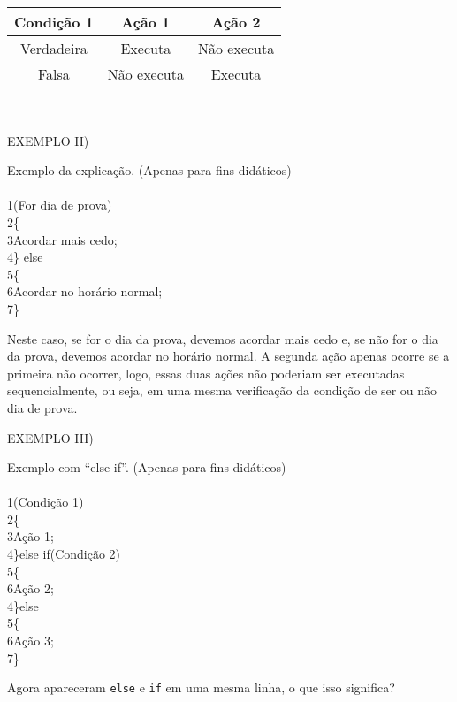 \documentclass[conference]{IEEEtran}
\begin{document}
\begin{table}[h]
    \centering
    \begin{tabular}{|c|c|c|}
        \hline
        \textbf{Condição 1} & \textbf{Ação 1} & \textbf{Ação 2} \\
        \hline
        Verdadeira & Executa & Não executa \\
        \hline
        Falsa & Não executa & Executa \\
        \hline
    \end{tabular}
\end{table}
\\
\begin{center}
EXEMPLO II)
\end{center}
\par
Exemplo da explicação. (Apenas para fins didáticos)
\\
\\
{\selectfont 
{\color{cinza}1}(For dia de prova)\\
{\color{cinza}2}\quad\{\\
{\color{cinza}3}\quad\quad Acordar mais cedo;\\
{\color{cinza}4}\quad\}{\color{verde} else}\\
{\color{cinza}5}\quad\{\\
{\color{cinza}6}\quad\quad Acordar no horário normal;\\
{\color{cinza}7}\quad\}}
\\
\par
Neste caso, se for o dia da prova, devemos acordar mais cedo e, se não for o dia da prova, devemos acordar no horário normal. A segunda ação apenas ocorre se a primeira não ocorrer, logo, essas duas ações não poderiam ser executadas sequencialmente, ou seja, em uma mesma verificação da condição de ser ou não dia de prova.\\

\begin{center}
EXEMPLO III)
\end{center}
\par
Exemplo com “else if”. (Apenas para fins didáticos)
\\
\\
{\selectfont 
{\color{cinza}1}(Condição 1)\\
{\color{cinza}2}\quad\{\\
{\color{cinza}3}\quad\quad Ação 1;\\
{\color{cinza}4}\quad\}{\color{verde}else if}(Condição 2)\\
{\color{cinza}5}\quad\{\\
{\color{cinza}6}\quad\quad Ação 2;\\
{\color{cinza}4}\quad\}{\color{verde}else}\\
{\color{cinza}5}\quad\{\\
{\color{cinza}6}\quad\quad Ação 3;\\
{\color{cinza}7}\quad\}}
\\
\par
Agora apareceram \texttt{else} e \texttt{if} em uma mesma linha, o que isso significa?
\end{document}
